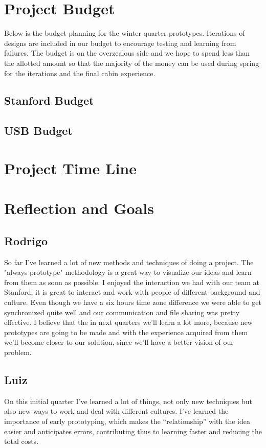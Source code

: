 \section{Project Budget}
Below is the budget planning for the winter quarter prototypes.  Iterations of designs are included in our budget to encourage testing and learning from failures. The budget is on the overzealous side and we hope to spend less than the allotted amount so that the majority of the money can be used during spring for the iterations and the final cabin experience.
\subsection{Stanford Budget}
\subsection{USB Budget}
 

\section{Project Time Line}
\section{Reflection and Goals}
\subsection{Rodrigo}
So far I’ve learned a lot of new methods and techniques of doing a project. The "always prototype" methodology is a great way to visualize our ideas and learn from them as soon as possible.
I enjoyed the interaction we had with our team at Stanford, it is great to interact and work with people of different background and culture. Even though we have a six hours time zone difference we were able to get synchronized quite well and our communication and file sharing was pretty effective.
I believe that the in next quarters we'll learn a lot more, because new prototypes are going to be made and with the experience acquired from them we'll become closer to our solution, since we'll have a better vision of our problem.

\subsection{Luiz}
On this initial quarter I’ve learned a lot of things, not only new techniques but also new ways to work and deal with different cultures. I’ve learned the importance of early prototyping, which makes the “relationship” with the idea easier and anticipates errors, contributing thus to learning faster and reducing the total costs.

